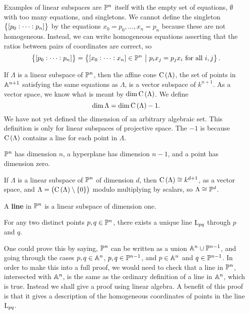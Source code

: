 \begin{example*}
Examples of linear subspaces are $ \PP^n $ itself with the empty set of equations, $ \emptyset $ with too many equations, and singletons. We cannot define the singleton $ \cbr{\sbr{p_0 : \dots : p_n}} $ by the equations $ x_0 = p_0, \dots, x_n = p_n $ because these are not homogeneous. Instead, we can write homogeneous equations asserting that the ratios between pairs of coordinates are correct, so
$$ \cbr{\sbr{p_0 : \dots : p_n}} = \cbr{\sbr{x_0 : \dots : x_n} \in \PP^n \st p_ix_j = p_jx_i \ \text{for all} \ i, j}. $$
\end{example*}

If $ \Lambda $ is a linear subspace of $ \PP^n $, then the affine cone $ \C\br{\Lambda} $, the set of points in $ \AA^{n + 1} $ satisfying the same equations as $ \Lambda $, is a vector subspace of $ k^{n + 1} $. As a vector space, we know what is meant by $ \dim \C\br{\Lambda} $. We define
$$ \dim \Lambda = \dim \C\br{\Lambda} - 1. $$
We have not yet defined the dimension of an arbitrary algebraic set. This definition is only for linear subspaces of projective space. The $ -1 $ is because $ \C\br{\Lambda} $ contains a line for each point in $ \Lambda $.

\begin{example*}
$ \PP^n $ has dimension $ n $, a hyperplane has dimension $ n - 1 $, and a point has dimension zero.
\end{example*}

If $ \Lambda $ is a linear subspace of $ \PP^n $ of dimension $ d $, then $ \C\br{\Lambda} \cong k^{d + 1} $, as a vector space, and $ \Lambda = \br{\C\br{\Lambda} \setminus \cbr{0}} $ modulo multiplying by scalars, so $ \Lambda \cong \PP^d $.

\begin{definition*}
A \textbf{line} in $ \PP^n $ is a linear subspace of dimension one.
\end{definition*}


\begin{lemma}
For any two distinct points $ p, q \in \PP^n $, there exists a unique line $ \L_{pq} $ through $ p $ and $ q $.
\end{lemma}

One could prove this by saying, $ \PP^n $ can be written as a union $ \AA^n \cup \PP^{n - 1} $, and going through the cases $ p, q \in \AA^n $, $ p, q \in \PP^{n - 1} $, and $ p \in \AA^n $ and $ q \in \PP^{n - 1} $. In order to make this into a full proof, we would need to check that a line in $ \PP^n $, intersected with $ \AA^n $, is the same as the ordinary definition of a line in $ \AA^n $, which is true. Instead we shall give a proof using linear algebra. A benefit of this proof is that it gives a description of the homogeneous coordinates of points in the line $ \L_{pq} $.


